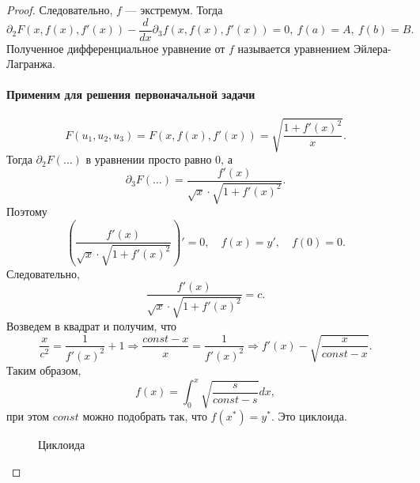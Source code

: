 \begin{proof}
Следовательно, $ f$ --- экстремум. Тогда  \[
	\partial _2 F(x, f(x), f'(x)) - \frac{d}{dx}\partial _3 f(x, f(x), f'(x)) = 0, ~ f(a) = A , ~ f(b) = B
.\] 
Полученное дифференциальное уравнение от $ f$ называется  {\sf уравнением Эйлера-Лагранжа}.  
\paragraph{Применим для решения первоначальной задачи}
\[
	F(u_1, u_2, u_3) = F(x, f(x), f'(x)) = \sqrt{ \frac{1+f'(x)^2}{x}} 
.\] 
Тогда $ \partial _2 F(\ldots )$  в уравнении просто равно 0, а
\[
	\partial _3 F(\ldots ) = \frac{f'(x)}{\sqrt{ x} \cdot \sqrt{ 1 + f'(x)^2}  }
.\] 
Поэтому 
\[
	\left( \frac{f'(x)}{\sqrt{ x} \cdot \sqrt{ 1 + f'(x)^2} } \right)' = 0, \quad f(x) = y', \quad f(0) = 0
.\] 
Следовательно, 
\[
	\frac{f'(x)}{\sqrt{ x} \cdot \sqrt{ 1+f'(x)^2} } = c
.\] 
Возведем в квадрат и получим, что
\[
	\frac{x}{c^2} = \frac{1}{f'(x)^2} +1 \Longrightarrow \frac{const -x}{x} = \frac{1}{f'(x)^2} \Longrightarrow f'(x) - \sqrt{ \frac{x}{const-x}} 
.\] 
Таким образом,
\[
	f(x) = \int_{0}^{x} \sqrt{ \frac{s}{const - s}}dx  
,\] 
при этом $ const$ можно подобрать так, что $ f(x^{*}) = y^{*}$. Это {\sf циклоида}.  
\begin{figure}[ht]
    \centering
    \caption{Циклоида}
    \label{fig:cycloid}
\end{figure}
\end{proof}
% 
